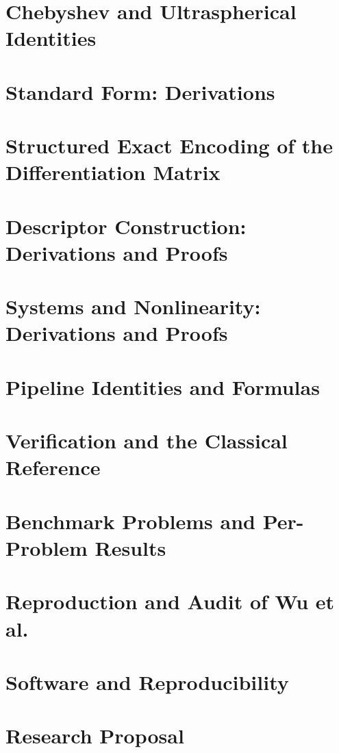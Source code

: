 \section{Chebyshev and Ultraspherical Identities}
\label{app:cheb}


\section{Standard Form: Derivations}
\label{app:pihm-residual}


\section{Structured Exact Encoding of the Differentiation Matrix}
\label{app:structured}


\section{Descriptor Construction: Derivations and Proofs}
\label{app:descriptor}


\section{Systems and Nonlinearity: Derivations and Proofs}
\label{app:nonlinear}


\section{Pipeline Identities and Formulas}
\label{app:pipeline}


\section{Verification and the Classical Reference}
\label{app:verification}


\section{Benchmark Problems and Per-Problem Results}
\label{app:catalogue}


\section{Reproduction and Audit of Wu et al.}
\label{app:reproduction}


\section{Software and Reproducibility}
\label{app:software}


\section{Research Proposal}
\label{app:proposal}

